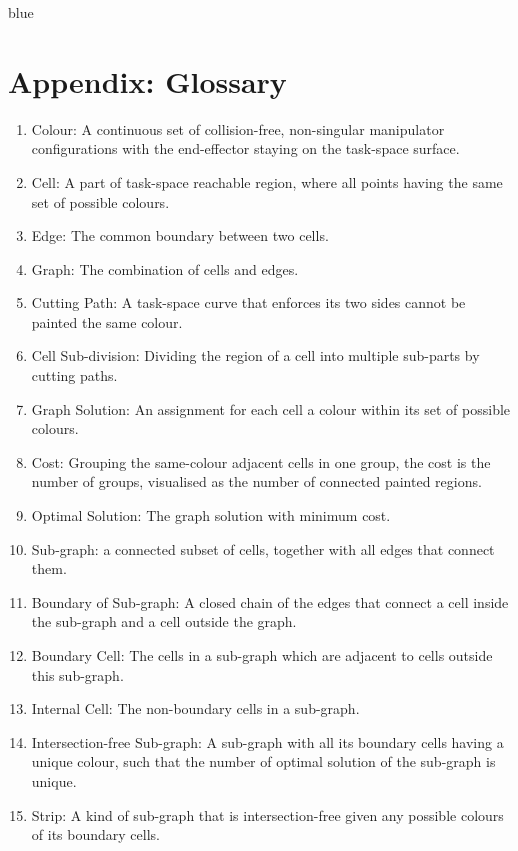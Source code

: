 \documentclass[journal]{IEEEtran}
\begin{document}
\begin{color}{blue}
\section*{Appendix: Glossary}
\begin{enumerate}
\item Colour: A continuous set of collision-free, non-singular manipulator configurations with the end-effector staying on the task-space surface. 
\item Cell: A part of task-space reachable region, where all points having the same set of possible colours. 
\item Edge: The common boundary between two cells. 
\item Graph: The combination of cells and edges. 
\item Cutting Path: A task-space curve that enforces its two sides cannot be painted the same colour. 
\item Cell Sub-division: Dividing the region of a cell into multiple sub-parts by cutting paths. 
\item Graph Solution: An assignment for each cell a colour within its set of possible colours. 
\item Cost: Grouping the same-colour adjacent cells in one group, the cost is the number of groups, visualised as the number of connected painted regions. 
\item Optimal Solution: The graph solution with minimum cost. 
\item Sub-graph: a connected subset of cells, together with all edges that connect them. 
\item Boundary of Sub-graph: A closed chain of the edges that connect a cell inside the sub-graph and a cell outside the graph. \item Boundary Cell: The cells in a sub-graph which are adjacent to cells outside this sub-graph. 
\item Internal Cell: The non-boundary cells in a sub-graph. 
\item Intersection-free Sub-graph: A sub-graph with all its boundary cells having a unique colour, such that the number of optimal solution of the sub-graph is unique. 
\item Strip: A kind of sub-graph that is intersection-free given any possible colours of its boundary cells.
\end{enumerate}

\end{color}




\end{document}
